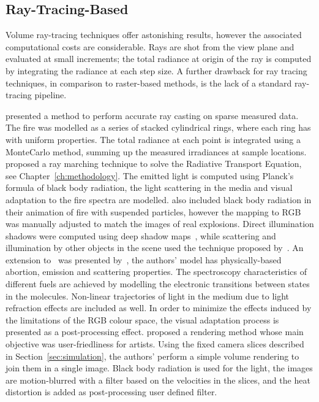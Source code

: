 \subsection{Ray-Tracing-Based}
\label{sec:ray_tracing_based}

Volume ray-tracing techniques offer astonishing results, however the associated computational costs are considerable.
Rays are shot from the view plane and evaluated at small increments; the total radiance at origin of the ray is computed by integrating the radiance at each step size.
A further drawback for ray tracing techniques, in comparison to raster-based methods, is the lack of a standard ray-tracing pipeline.

\cite{Rushmeier:1995} presented a method to perform accurate ray casting on sparse measured data.
The fire was modelled as a series of stacked cylindrical rings, where each ring has with uniform properties.
The total radiance at each point is integrated using a MonteCarlo method, summing up the measured irradiances at sample locations. 
\cite{Nguyen:2002} proposed a ray marching technique to solve the Radiative Transport Equation, see Chapter~\ref{ch:methodology}.
The emitted light is computed using Planck's formula of black body radiation, the light scattering in the media and visual adaptation to the fire spectra are modelled.
\cite{Feldman:2003} also included black body radiation in their animation of fire with suspended particles, however the mapping to RGB was manually adjusted to match the images of real explosions.
Direct illumination shadows were computed using deep shadow maps~\cite{Lokovic:2000}, while scattering and illumination by other objects in the scene used the technique proposed by~\cite{Jensen:2002}.
An extension to~\cite{Nguyen:2002} was presented by~\cite{Pegoraro:2006}, the authors' model has physically-based abortion, emission and scattering properties.
The spectroscopy characteristics of different fuels are achieved by modelling the electronic transitions between states in the molecules.
Non-linear trajectories of light in the medium due to light refraction effects are included as well.
In order to minimize the effects induced by the limitations of the RGB colour space, the visual adaptation process is presented as a post-processing effect.
\cite{Horvath:2009} proposed a rendering method whose main objective was user-friedliness for artists.
Using the fixed camera slices described in Section~\ref{sec:simulation}, the authors' perform a simple volume rendering to join them in a single image.
Black body radiation is used for the light, the images are motion-blurred with a filter based on the velocities in the slices, and the heat distortion is added as post-processing user defined filter. 